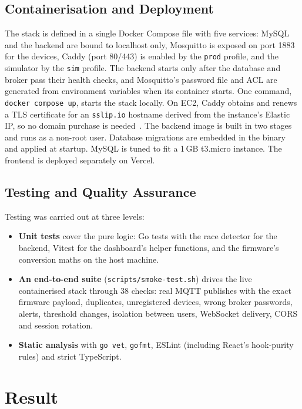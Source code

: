 \documentclass[11pt,a4paper,oneside]{report}
\newcommand{\code}[1]{\texttt{#1}}
\begin{document}
\section{Containerisation and Deployment}
The stack is defined in a single Docker Compose file with five services: MySQL and the
backend are bound to localhost only, Mosquitto is exposed on port 1883 for the devices,
Caddy (port 80/443) is enabled by the \code{prod} profile, and the simulator by the
\code{sim} profile. The backend starts only after the database and broker pass their
health checks, and Mosquitto's password file and ACL are generated from environment
variables when its container starts. One command, \code{docker compose up}, starts the
stack locally. On EC2, Caddy obtains and renews a TLS certificate for an \code{sslip.io}
hostname derived from the instance's Elastic IP, so no domain purchase is
needed~\cite{caddy}. The backend image is built in two stages and runs as a non-root
user. Database migrations are embedded in the binary and applied at startup. MySQL is
tuned to fit a 1\,GB t3.micro instance. The frontend is deployed separately on Vercel.

\section{Testing and Quality Assurance}
\label{sec:testing}
Testing was carried out at three levels:
\begin{itemize}
  \item \textbf{Unit tests} cover the pure logic: Go tests with the race detector for
        the backend, Vitest for the dashboard's helper functions, and the firmware's
        conversion maths on the host machine.
  \item \textbf{An end-to-end suite} (\code{scripts/smoke-test.sh}) drives the live
        containerised stack through 38 checks: real MQTT publishes with the exact
        firmware payload, duplicates, unregistered devices, wrong broker passwords,
        alerts, threshold changes, isolation between users, WebSocket delivery, CORS
        and session rotation.
  \item \textbf{Static analysis} with \code{go vet}, \code{gofmt}, ESLint (including
        React's hook-purity rules) and strict TypeScript.
\end{itemize}

\chapter{Result}
\end{document}
